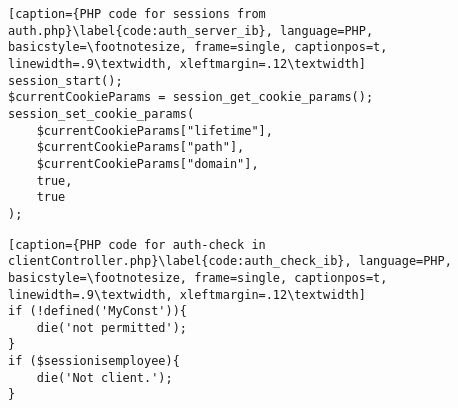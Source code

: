 \begin{lstlisting}[caption={PHP code for sessions from auth.php}\label{code:auth_server_ib}, language=PHP, basicstyle=\footnotesize, frame=single, captionpos=t, linewidth=.9\textwidth, xleftmargin=.12\textwidth]
session_start();
$currentCookieParams = session_get_cookie_params(); 
session_set_cookie_params( 
    $currentCookieParams["lifetime"], 
    $currentCookieParams["path"], 
    $currentCookieParams["domain"], 
    true, 
    true 
); 
\end{lstlisting}
\begin{lstlisting}[caption={PHP code for auth-check in clientController.php}\label{code:auth_check_ib}, language=PHP, basicstyle=\footnotesize, frame=single, captionpos=t, linewidth=.9\textwidth, xleftmargin=.12\textwidth]
if (!defined('MyConst')){
    die('not permitted');
}
if ($sessionisemployee){
    die('Not client.');
}
\end{lstlisting}